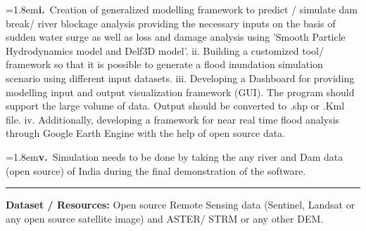 \documentclass[10pt,a4paper]{article}
\begin{document}
\begin{tcolorbox}[pscard, title={"\textbf{SIH26161} \quad $\vert$ \quad Dam Break Inundation Modelling Using Hydrodynamic Modelling of any River}]
\noindent\hangindent=1.8em\textbf{i.}~\small Creation of generalized modelling framework to predict / simulate dam break/ river blockage analysis providing the necessary inputs on the basis of sudden water surge as well as loss and damage analysis using 'Smooth Particle Hydrodynamics model and Delf3D model'. ii. Building a customized tool/ framework so that it is possible to generate a flood inundation simulation scenario using different input datasets. iii. Developing a Dashboard for providing modelling input and output visualization framework (GUI). The program should support the large volume of data. Output should be converted to .shp or .Kml file. iv. Additionally, developing a framework for near real time flood analysis through Google Earth Engine with the help of open source data.\par\vspace{0.06cm}
\noindent\hangindent=1.8em\textbf{v.}~\small Simulation needs to be done by taking the any river and Dam data (open source) of India during the final demonstration of the software.\par\vspace{0.06cm}


\vspace{0.2cm}
\hrule
\vspace{0.2cm}
{\footnotesize
\textbf{Dataset / Resources:} Open source Remote Sensing data (Sentinel, Landsat or any open source satellite image) and ASTER/ STRM or any other DEM.
}

\end{tcolorbox}
\vspace{0.4cm}
{}
\end{document}
